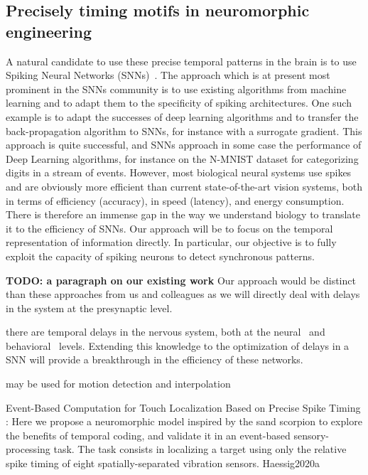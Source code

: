 \documentclass[brainsci, %
               review,submit,pdftex,moreauthors%
               ]{Definitions/mdpi}
\begin{document}
\subsection{Precisely timing motifs in neuromorphic engineering}
A natural candidate to use these precise temporal patterns in the brain is to use Spiking Neural Networks (SNNs)~\citep{maass_networks_1997}. The approach which is at present most prominent in the SNNs community is to use existing algorithms from machine learning and to adapt them to the specificity of spiking architectures. One such example is to adapt the successes of deep learning algorithms and to transfer the back-propagation algorithm to SNNs, for instance with a surrogate gradient. This approach is quite successful, and SNNs approach in some case the performance of Deep Learning algorithms, for instance on the N-MNIST dataset for categorizing digits in a stream of events. However, most biological neural systems use spikes and are obviously more efficient than current state-of-the-art vision systems, both in terms of efficiency (accuracy), in speed (latency), and energy consumption. There is therefore an immense gap in the way we understand biology to translate it to the efficiency of SNNs. Our approach will be to focus on the temporal representation of information directly. In particular, our objective is to fully exploit the capacity of spiking neurons to detect synchronous patterns.

\textbf{TODO: a paragraph on our existing work}
Our approach would be distinct than these approaches from us and colleagues as we will directly deal with delays in the system at the presynaptic level.

there are temporal delays in the nervous system, both at the neural~\citep{perrinet_active_2014} and behavioral~\citep{khoei_flash-lag_2017} levels. Extending this knowledge to the optimization of delays in a SNN will provide a breakthrough in the efficiency of these networks.

may be used for motion detection and interpolation~\citep{kaplan_anisotropic_2013}~\citep{khoei_flash-lag_2017}

Event-Based Computation for Touch Localization Based on Precise Spike Timing : Here we propose a neuromorphic model inspired by the sand scorpion to explore the benefits of temporal coding, and validate it in an event-based sensory-processing task. The task consists in localizing a target using only the relative spike timing of eight spatially-separated vibration sensors.  Haessig2020a
\end{document}
